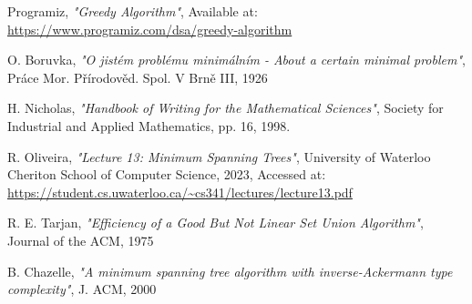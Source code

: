 \documentclass[11pt]{article}
\begin{document}
\pagebreak 

\begin{thebibliography}{30}
     Programiz, \emph{"Greedy Algorithm"}, Available at: \url{https://www.programiz.com/dsa/greedy-algorithm}

     O. Boruvka, \emph{"O jistém problému minimálním - About a certain minimal problem"}, Práce Mor. Přírodověd. Spol. V Brně III, 1926

     H. Nicholas, \emph{"Handbook of Writing for the Mathematical Sciences"}, Society for Industrial and Applied Mathematics, pp. 16, 1998.

     R. Oliveira, \emph{"Lecture 13: Minimum Spanning Trees"}, University of Waterloo Cheriton School of Computer Science, 2023, Accessed at: \url{https://student.cs.uwaterloo.ca/~cs341/lectures/lecture13.pdf}

     R. E. Tarjan, \emph{"Efficiency of a Good But Not Linear Set Union Algorithm"}, Journal of the ACM, 1975
    
     B. Chazelle, \emph{"A minimum spanning tree algorithm with inverse-Ackermann type complexity"}, J. ACM, 2000 

\end{thebibliography}
\end{document}
